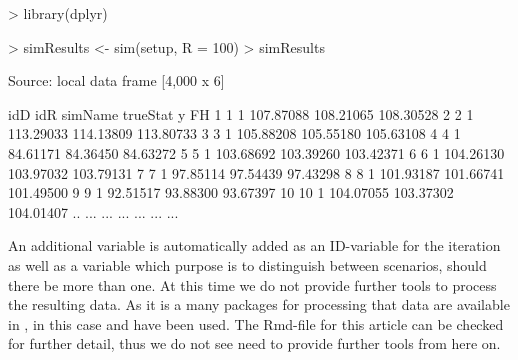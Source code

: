 \documentclass[article]{ajs}
\begin{document}
\begin{Schunk}
\begin{Sinput}
> library(dplyr)
\end{Sinput}
\end{Schunk}
\begin{Schunk}
\begin{Sinput}
> simResults <- sim(setup, R = 100) %
> simResults %
\end{Sinput}
\begin{Soutput}
Source: local data frame [4,000 x 6]

   idD idR simName  trueStat         y        FH
1    1   1         107.87088 108.21065 108.30528
2    2   1         113.29033 114.13809 113.80733
3    3   1         105.88208 105.55180 105.63108
4    4   1          84.61171  84.36450  84.63272
5    5   1         103.68692 103.39260 103.42371
6    6   1         104.26130 103.97032 103.79131
7    7   1          97.85114  97.54439  97.43298
8    8   1         101.93187 101.66741 101.49500
9    9   1          92.51517  93.88300  93.67397
10  10   1         104.07055 103.37302 104.01407
.. ... ...     ...       ...       ...       ...
\end{Soutput}
\end{Schunk}

An additional variable  is automatically added as an ID-variable for the iteration as well as a variable  which purpose is to distinguish between scenarios, should there be more than one. At this time we do not provide further tools to process the resulting data. As it is a  many packages for processing that data are available in , in this case  \citep{wickham14} and  \citep{wickham07} have been used. The Rmd-file for this article can be checked for further detail, thus we do not see need to provide further tools from here on.
\end{document}
